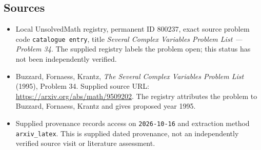\documentclass[11pt]{article}
\begin{document}
\subsection{Sources}
\begin{itemize}
\item Local UnsolvedMath registry, permanent ID \(800237\), exact source problem code \texttt{catalogue entry}, title \emph{Several Complex Variables Problem List --- Problem 34}. The supplied registry labels the problem open; this status has not been independently verified.
\item Buzzard, Fornaess, Krantz, \emph{The Several Complex Variables Problem List} (1995), Problem 34. Supplied source URL: \url{https://arxiv.org/abs/math/9509202}. The registry attributes the problem to Buzzard, Fornaess, Krantz and gives proposed year 1995.
\item Supplied provenance records access on \texttt{2026-10-16} and extraction method \texttt{arxiv\_latex}. This is supplied dated provenance, not an independently verified source visit or literature assessment.
\end{itemize}
\end{document}
